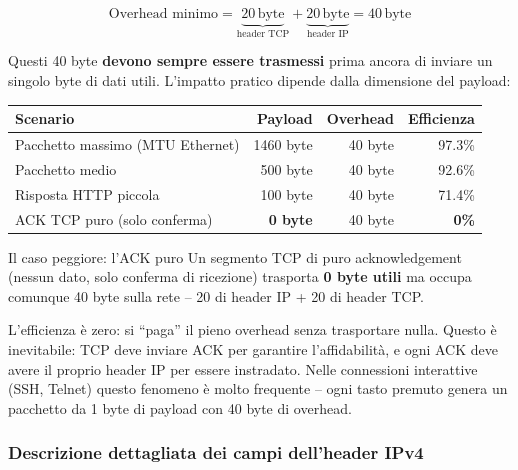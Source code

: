 \documentclass[a4paper,12pt]{report}
\begin{document}
\vspace{0.3cm}

\[
\text{Overhead minimo} = \underbrace{20\,\text{byte}}_{\text{header TCP}}
+ \underbrace{20\,\text{byte}}_{\text{header IP}}
= \boxed{40\,\text{byte}}
\]

Questi 40 byte \textbf{devono sempre essere trasmessi} prima ancora di
inviare un singolo byte di dati utili. L'impatto pratico dipende dalla
dimensione del payload:

\begin{center}
\begin{tabular}{lrrr}
\toprule
\textbf{Scenario} & \textbf{Payload} & \textbf{Overhead} &
\textbf{Efficienza} \\
\midrule
Pacchetto massimo (MTU Ethernet) & 1460 byte & 40 byte & 97.3\% \\
Pacchetto medio & 500 byte  & 40 byte & 92.6\% \\
Risposta HTTP piccola & 100 byte & 40 byte & 71.4\% \\
ACK TCP puro (solo conferma) & \textbf{0 byte} & 40 byte &
\textbf{0\%} \\
\bottomrule
\end{tabular}
\end{center}

\begin{notebox}{Il caso peggiore: l'ACK puro}
Un segmento TCP di puro acknowledgement (nessun dato, solo conferma
di ricezione) trasporta \textbf{0 byte utili} ma occupa comunque
40 byte sulla rete -- 20 di header IP + 20 di header TCP.

\vspace{0.5cm}
L'efficienza è zero: si ``paga'' il pieno overhead senza trasportare
nulla. Questo è inevitabile: TCP deve inviare ACK per garantire
l'affidabilità, e ogni ACK deve avere il proprio header IP per essere
instradato. Nelle connessioni interattive (SSH, Telnet) questo fenomeno
è molto frequente -- ogni tasto premuto genera un pacchetto da 1 byte
di payload con 40 byte di overhead.
\end{notebox}


\subsubsection*{Descrizione dettagliata dei campi dell'header IPv4}
\vspace{1cm}
\end{document}
